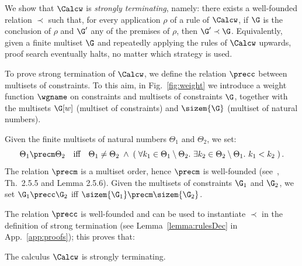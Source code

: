 \noindent
We show that $\Calcw$ is \emph{strongly terminating}, namely: there
exists a well-founded relation $\prec$ such that, for every
application $\rho$ of a rule of $\Calcw$, if $\G$ is the conclusion of
$\rho$ and $\G'$ any of the premises of $\rho$, then $\G'\prec \G$.
Equivalently, given a finite multiset $\G$ and repeatedly applying the
rules of $\Calcw$ upwards, proof search eventually halts, no matter
which strategy is used.

To prove strong termination of $\Calcw$, we define the relation
$\precc$ between multisets of constraints.  To this aim, in
Fig.~\ref{fig:weight} we introduce a weight function $\wgname$ on
constraints and multisets of constraints $\G$, together with the
multisets $\G[w]$ (multiset of constraints) and $\sizem{\G}$ (multiset
of natural numbers).




Given the finite multisets of natural numbers
$\Theta_1$ and $\Theta_2$,  we set:%
\[
\Theta_1 \precm \Theta_2
\quad\mbox{iff}\quad
\Theta_1\neq
\Theta_2 \;\land\; \left(\; \forall k_1 \in \Theta_1\setminus
  \Theta_2.\ \exists k_2\in \Theta_2 \setminus \Theta_1.\ k_1 < k_2
  \;\right).
\]  
The relation $\precm$ is a multiset order, hence $\precm$ is
well-founded (see~\cite{BaaderN:98}, Th.~2.5.5 and Lemma 2.5.6).
Given the multisets of constraints $\G_1$ and $\G_2$,
we set $\G_1 \precc \G_2$ iff  $\sizem{\G_1} \precm\sizem{\G_2}$. 



The relation $\precc$ is well-founded and can be used to instantiate
$\prec$ in the definition of strong termination (see
Lemma~\ref{lemma:rulesDec} in App.~\ref{app:proofs}); this proves that:

\begin{proposition}\label{prop:term}
  The calculus $\Calcw$ is strongly terminating.
\end{proposition}

